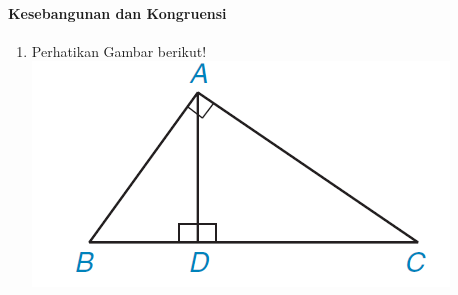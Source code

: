 \documentclass[12pt,a4paper]{exam}
\begin{document}
		\paragraph{Kesebangunan dan Kongruensi}
		\begin{enumerate}
			\item Perhatikan Gambar berikut!\\
			\includegraphics[width=0.5\linewidth]{screenshot003}
			

\end{enumerate}
\end{document}

